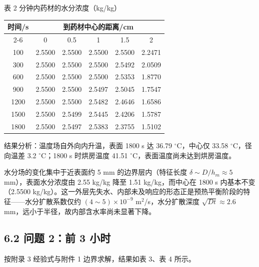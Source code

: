 \documentclass[12pt,a4paper]{ctexart}
\begin{document}
\begin{center}
\begin{minipage}{\textwidth}
\centering
{\heiti{} 表 2 分钟内药材的水分浓度（kg/kg）}
\par\medskip
{\begin{tabular}{cccccc}
\toprule
时间/s & \multicolumn{5}{c}{到药材中心的距离/cm} \\
\cmidrule(lr){2-6}
 & 0 & 0.5 & 1 & 1.5 & 2 \\
\midrule
100  & 2.5500 & 2.5500 & 2.5500 & 2.5500 & 2.2471 \\
300  & 2.5500 & 2.5500 & 2.5500 & 2.5492 & 2.0509 \\
600  & 2.5500 & 2.5500 & 2.5500 & 2.5353 & 1.8770 \\
900  & 2.5500 & 2.5500 & 2.5497 & 2.5045 & 1.7547 \\
1200 & 2.5500 & 2.5500 & 2.5482 & 2.4646 & 1.6586 \\
1500 & 2.5500 & 2.5499 & 2.5445 & 2.4206 & 1.5787 \\
1800 & 2.5500 & 2.5497 & 2.5383 & 2.3755 & 1.5102 \\
\bottomrule
\end{tabular}}
\end{minipage}
\end{center}

结果分析：温度场自外向内升温，表面 1800 s 达 36.79 $^\circ$C，中心仅 33.58 $^\circ$C，径向温差 3.2 $^\circ$C；1800 s 时烘房温度 41.51 $^\circ$C，表面温度尚未达到烘房温度。

水分场的变化集中于近表面约 5 mm 的边界层内（特征长度 $\delta\sim D/h_m\approx5$ mm），表面水分浓度由 2.55 kg/kg 降至 1.51 kg/kg，而中心在 1800 s 内基本不变（2.5500 kg/kg）。这一外层先失水、内部未及响应的形态正是预热平衡阶段的特征——水分扩散系数仅约 $(4\sim5)\times10^{-9}$ m$^2$/s，水分扩散深度 $\sqrt{Dt}\approx2.6$ mm，远小于半径，故内部含水率尚未显著下降。

\subsection{6.2 问题 2：前 3 小时}

按附录 3 经验式与附件 1 边界求解，结果如表 3、表 4 所示。
\end{document}
